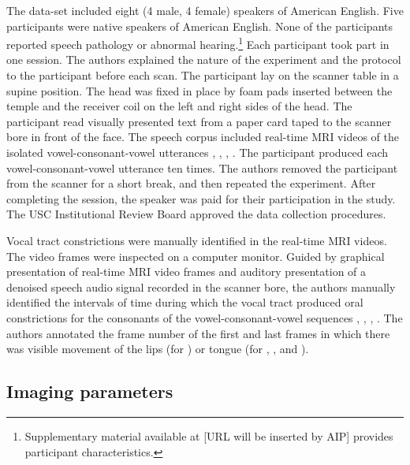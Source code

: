 \documentclass[reprint]{JASAnew}\usepackage[]{graphicx}\usepackage[]{color}
\begin{document}
The data-set included eight (4 male, 4 female) speakers of American English. Five participants were native speakers of American English. None of the participants reported speech pathology or abnormal hearing.\footnote{Supplementary material available at [URL will be inserted by AIP] provides participant characteristics.} Each participant took part in one session. The authors explained the nature of the experiment and the protocol to the participant before each scan. The participant lay on the scanner table in a supine position. The head was fixed in place by foam pads inserted between the temple and the receiver coil on the left and right sides of the head. The participant read visually presented text from a paper card taped to the scanner bore in front of the face. The speech corpus included real-time MRI videos of the isolated vowel-consonant-vowel utterances \textipa{[apa]}, \textipa{[ata]}, \textipa{[aka]}, \textipa{[aja]}. The participant produced each vowel-consonant-vowel utterance ten times. The authors removed the participant from the scanner for a short break, and then repeated the experiment. After completing the session, the speaker was paid for their participation in the study. The USC Institutional Review Board approved the data collection procedures. 

Vocal tract constrictions were manually identified in the real-time MRI videos. 
%
The video frames were inspected on a computer monitor. 
%
Guided by graphical presentation of real-time MRI video frames and auditory presentation of a denoised speech audio signal recorded in the scanner bore, the authors manually identified the intervals of time during which the vocal tract produced oral constrictions for the consonants of the vowel-consonant-vowel sequences \textipa{[apa]}, \textipa{[ata]}, \textipa{[aka]}, \textipa{[aja]}. 
%
The authors annotated the frame number of the first and last frames in which there was visible movement of the lips (for \textipa{[apa]}) or tongue (for \textipa{[ata]}, \textipa{[aka]}, and \textipa{[aja]}). 




\subsection{Imaging parameters}
\end{document}
